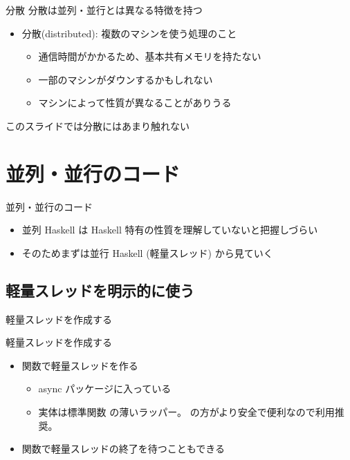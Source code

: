 \documentclass[unicode,12pt]{beamer}
\begin{document}
\begin{frame}{分散}
  分散は並列・並行とは異なる特徴を持つ
  \begin{itemize}
  \item 分散(distributed): 複数のマシンを使う処理のこと
    \begin{itemize}
    \item 通信時間がかかるため、基本共有メモリを持たない
    \item 一部のマシンがダウンするかもしれない
    \item マシンによって性質が異なることがありうる
    \end{itemize}
  \end{itemize}
  このスライドでは分散にはあまり触れない
\end{frame}

\section{並列・並行のコード}

\begin{frame}{並列・並行のコード}
  \begin{itemize}
  \item 並列 Haskell は Haskell 特有の性質を理解していないと把握しづらい
  \item そのためまずは並行 Haskell (軽量スレッド) から見ていく
  \end{itemize}
\end{frame}

\subsection{軽量スレッドを明示的に使う}

\begin{frame}{軽量スレッドを作成する}
  
\end{frame}

\begin{frame}{軽量スレッドを作成する}
  \begin{itemize}
  \item \alert{} 関数で軽量スレッドを作る
    \begin{itemize}
    \item async パッケージに入っている
    \item 実体は標準関数  の薄いラッパー。
       の方がより安全で便利なので利用推奨。
    \end{itemize}
    \item {} 関数で軽量スレッドの終了を待つこともできる
  \end{itemize}
\end{frame}
\end{document}

